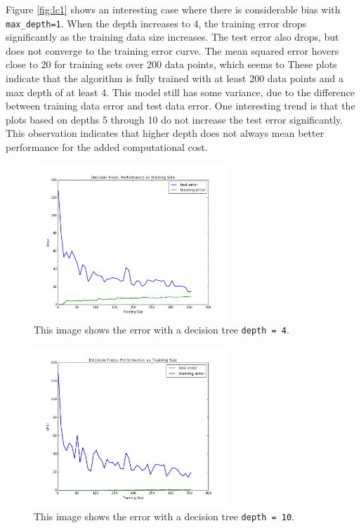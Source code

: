 \documentclass[12pt,letterpaper]{article}
\begin{document}
Figure \ref{fig:lc1} shows an interesting case where there is considerable bias with \verb|max_depth=1|.
When the depth increases to 4, the training error drops significantly as the training data size increases.
The test error also drops, but does not converge to the training error curve.
The mean squared error hovers close to 20 for training sets over 200 data points, which seems to 
These plots indicate that the algorithm is fully trained with at least 200 data points and a max depth of at least 4.
This model still has some variance, due to the difference between training data error and test data error.
One interesting trend is that the plots based on depths 5 through 10 do not increase the test error significantly.
This observation indicates that higher depth does not always mean better performance for the added computational cost. \\

\begin{figure}[h!]
	\centering
	\includegraphics[width=0.65\textwidth]{dt-learningcurve-4.png}
	\caption{This image shows the error with a decision tree \texttt{depth = 4}.}
	\label{fig:lc4}
\end{figure}

\begin{figure}[h!]
	\centering
	\includegraphics[width=0.65\textwidth]{dt-learningcurve-10.png}
	\caption{This image shows the error with a decision tree \texttt{depth = 10}.}
	\label{fig:lc10}
\end{figure}
\end{document}
